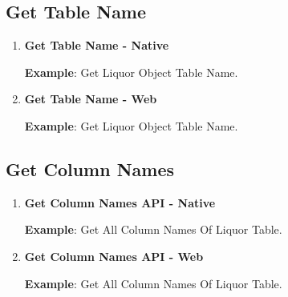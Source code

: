 	\subsection{Get Table Name}

		\begin{enumerate}

			\item \small \textbf{Get Table Name - Native}
				

				\par
				\textbf{Example}: Get Liquor Object Table Name.
					


			\item \small \textbf{Get Table Name - Web}
				

				\par
				\textbf{Example}: Get Liquor Object Table Name.
					

		\end{enumerate}

		

	\subsection{Get Column Names}

		\begin{enumerate}

			\item \small \textbf{Get Column Names API - Native}
				

				\par
				\textbf{Example}: Get All Column Names Of Liquor Table.
					
			
			\item \small \textbf{Get Column Names API - Web}
				

				\par
				\textbf{Example}: Get All Column Names Of Liquor Table.
					

		\end{enumerate}



